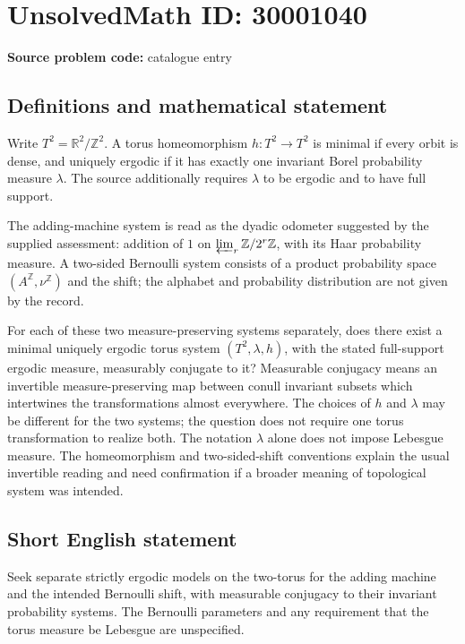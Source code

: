 \documentclass[11pt]{article}
\newcommand{\Z}{\mathbb{Z}}
\newcommand{\R}{\mathbb{R}}
\begin{document}
\section*{UnsolvedMath ID: 30001040}
\textbf{Source problem code:} catalogue entry
\subsection{Definitions and mathematical statement}
Write \(T^2=\R^2/\Z^2\). A torus homeomorphism \(h:T^2\to T^2\) is minimal if every orbit is dense, and uniquely ergodic if it has exactly one invariant Borel probability measure \(\lambda\). The source additionally requires \(\lambda\) to be ergodic and to have full support.

The adding-machine system is read as the dyadic odometer suggested by the supplied assessment: addition of \(1\) on \(\varprojlim_r\Z/2^r\Z\), with its Haar probability measure. A two-sided Bernoulli system consists of a product probability space \((A^\Z,\nu^\Z)\) and the shift; the alphabet and probability distribution are not given by the record.

For each of these two measure-preserving systems separately, does there exist a minimal uniquely ergodic torus system \((T^2,\lambda,h)\), with the stated full-support ergodic measure, measurably conjugate to it? Measurable conjugacy means an invertible measure-preserving map between conull invariant subsets which intertwines the transformations almost everywhere. The choices of \(h\) and \(\lambda\) may be different for the two systems; the question does not require one torus transformation to realize both. The notation \(\lambda\) alone does not impose Lebesgue measure. The homeomorphism and two-sided-shift conventions explain the usual invertible reading and need confirmation if a broader meaning of topological system was intended.
\subsection{Short English statement}
Seek separate strictly ergodic models on the two-torus for the adding machine and the intended Bernoulli shift, with measurable conjugacy to their invariant probability systems. The Bernoulli parameters and any requirement that the torus measure be Lebesgue are unspecified.
\end{document}
